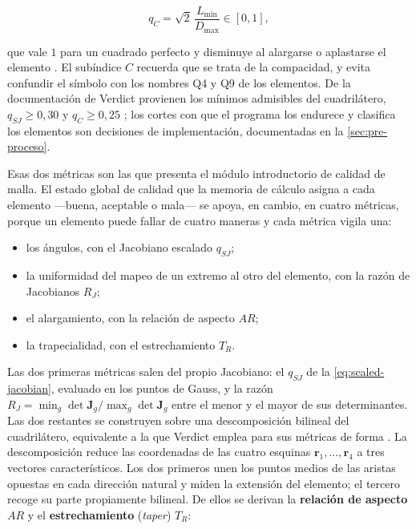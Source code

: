 \begin{equation}
q_C = \sqrt{2}\,\frac{L_{\min}}{D_{\max}} \in [0, 1],
\label{eq:stretch}
\end{equation}

que vale $1$ para un cuadrado perfecto y disminuye al alargarse o aplastarse el elemento \autocite[p.~57]{stimpson2007verdict}. El subíndice $C$ recuerda que se trata de la compacidad, y evita confundir el símbolo con los nombres Q4 y Q9 de los elementos. De la documentación de Verdict provienen los mínimos admisibles del cuadrilátero, $q_{SJ} \ge 0{,}30$ y $q_C \ge 0{,}25$ \autocite[pp.~51, 57]{stimpson2007verdict}; los cortes con que el programa los endurece y clasifica los elementos son decisiones de implementación, documentadas en la \autoref{sec:pre-proceso}.

Esas dos métricas son las que presenta el módulo introductorio de calidad de malla. El estado global de calidad que la memoria de cálculo asigna a cada elemento —buena, aceptable o mala— se apoya, en cambio, en cuatro métricas, porque un elemento puede fallar de cuatro maneras y cada métrica vigila una:

\begin{itemize}
    \item los ángulos, con el Jacobiano escalado $q_{SJ}$;
    \item la uniformidad del mapeo de un extremo al otro del elemento, con la razón de Jacobianos $R_J$;
    \item el alargamiento, con la relación de aspecto $AR$;
    \item la trapecialidad, con el estrechamiento $T_R$.
\end{itemize}

Las dos primeras métricas salen del propio Jacobiano: el $q_{SJ}$ de la \autoref{eq:scaled-jacobian}, evaluado en los puntos de Gauss, y la razón $R_J = \min_g \det\bm{J}_g / \max_g \det\bm{J}_g$ entre el menor y el mayor de sus determinantes. Las dos restantes se construyen sobre una descomposición bilineal del cuadrilátero, equivalente a la que Verdict emplea para sus métricas de forma \autocite[pp.~35-36]{stimpson2007verdict}. La descomposición reduce las coordenadas de las cuatro esquinas $\bm{r}_1,\dots,\bm{r}_4$ a tres vectores característicos. Los dos primeros unen los puntos medios de las aristas opuestas en cada dirección natural y miden la extensión del elemento; el tercero recoge su parte propiamente bilineal. De ellos se derivan la \textbf{relación de aspecto} $AR$ y el \textbf{estrechamiento} (\emph{taper}) $T_R$:

